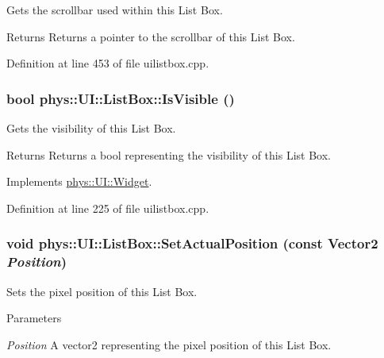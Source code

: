 Gets the scrollbar used within this List Box. 

\begin{DoxyReturn}{Returns}
Returns a pointer to the scrollbar of this List Box. 
\end{DoxyReturn}


Definition at line 453 of file uilistbox.cpp.

\hypertarget{classphys_1_1UI_1_1ListBox_a638f19eb6e5a0bd3291fab1ebaccc84f}{
\subsubsection[{IsVisible}]{\setlength{\rightskip}{0pt plus 5cm}bool phys::UI::ListBox::IsVisible ()}}
\label{d0/d28/classphys_1_1UI_1_1ListBox_a638f19eb6e5a0bd3291fab1ebaccc84f}


Gets the visibility of this List Box. 

\begin{DoxyReturn}{Returns}
Returns a bool representing the visibility of this List Box. 
\end{DoxyReturn}


Implements \hyperlink{classphys_1_1UI_1_1Widget_aaf1a1bd31b8e626467ce9cdb69bdf7ac}{phys::UI::Widget}.



Definition at line 225 of file uilistbox.cpp.

\hypertarget{classphys_1_1UI_1_1ListBox_afa7daa798bf8702bcc3e7c4cd9dcfdf4}{
\subsubsection[{SetActualPosition}]{\setlength{\rightskip}{0pt plus 5cm}void phys::UI::ListBox::SetActualPosition (const {\bf Vector2} {\em Position})}}
\label{d0/d28/classphys_1_1UI_1_1ListBox_afa7daa798bf8702bcc3e7c4cd9dcfdf4}


Sets the pixel position of this List Box. 


\begin{DoxyParams}{Parameters}
\item[{\em Position}]A vector2 representing the pixel position of this List Box. \end{DoxyParams}


